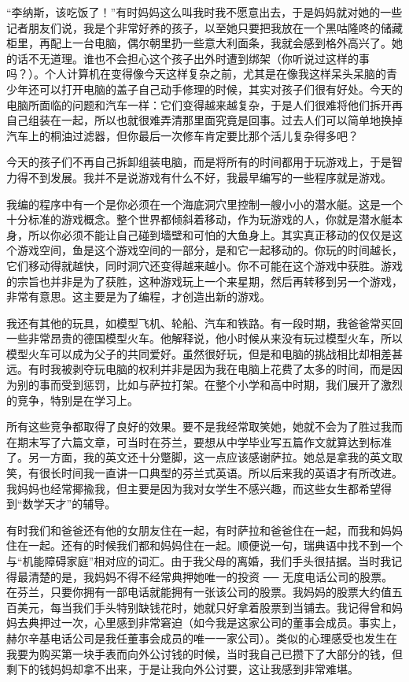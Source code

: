“李纳斯，该吃饭了！”有时妈妈这么叫我时我不愿意出去，于是妈妈就对她的一些记者朋友们说，我是个非常好养的孩子，以至她只要把我放在一个黑咕隆咚的储藏柜里，再配上一台电脑，偶尔朝里扔一些意大利面条，我就会感到格外高兴了。她的话不无道理。谁也不会担心这个孩子出外时遭到绑架（你听说过这样的事吗？）。个人计算机在变得像今天这样复杂之前，尤其是在像我这样呆头呆脑的青少年还可以打开电脑的盖子自己动手修理的时候，其实对孩子们很有好处。今天的电脑所面临的问题和汽车一样：它们变得越来越复杂，于是人们很难将他们拆开再自己组装在一起，所以也就很难弄清那里面究竟是回事。过去人们可以简单地换掉汽车上的桐油过滤器，但你最后一次修车肯定要比那个活儿复杂得多吧？

今天的孩子们不再自己拆卸组装电脑，而是将所有的时间都用于玩游戏上，于是智力得不到发展。我并不是说游戏有什么不好，我最早编写的一些程序就是游戏。

我编的程序中有一个是你必须在一个海底洞穴里控制一艘小小的潜水艇。这是一个十分标准的游戏概念。整个世界都倾斜着移动，作为玩游戏的人，你就是潜水艇本身，所以你必须不能让自己碰到墙壁和可怕的大鱼身上。其实真正移动的仅仅是这个游戏空间，鱼是这个游戏空间的一部分，是和它一起移动的。你玩的时间越长，它们移动得就越快，同时洞穴还变得越来越小。你不可能在这个游戏中获胜。游戏的宗旨也并非是为了获胜，这种游戏玩上一个来星期，然后再转移到另一个游戏，非常有意思。这主要是为了编程，才创造出新的游戏。

我还有其他的玩具，如模型飞机、轮船、汽车和铁路。有一段时期，我爸爸常买回一些非常昂贵的德国模型火车。他解释说，他小时候从来没有玩过模型火车，所以模型火车可以成为父子的共同爱好。虽然很好玩，但是和电脑的挑战相比却相差甚远。有时我被剥夺玩电脑的权利并非是因为我在电脑上花费了太多的时间，而是因为别的事而受到惩罚，比如与萨拉打架。在整个小学和高中时期，我们展开了激烈的竞争，特别是在学习上。

所有这些竞争都取得了良好的效果。要不是我经常取笑她，她就不会为了胜过我而在期末写了六篇文章，可当时在芬兰，要想从中学毕业写五篇作文就算达到标准了。另一方面，我的英文还十分蹩脚，这一点应该感谢萨拉。她总是拿我的英文取笑，有很长时间我一直讲一口典型的芬兰式英语。所以后来我的英语才有所改进。我妈妈也经常揶揄我，但主要是因为我对女学生不感兴趣，而这些女生都希望得到“数学天才”的辅导。

有时我们和爸爸还有他的女朋友住在一起，有时萨拉和爸爸住在一起，而我和妈妈住在一起。还有的时候我们都和妈妈住在一起。顺便说一句，瑞典语中找不到一个与“机能障碍家庭”相对应的词汇。由于我父母的离婚，我们手头很拮据。当时我记得最清楚的是，我妈妈不得不经常典押她唯一的投资 ── 无度电话公司的股票。在芬兰，只要你拥有一部电话就能拥有一张该公司的股票。我妈妈的股票大约值五百美元，每当我们手头特别缺钱花时，她就只好拿着股票到当铺去。我记得曾和妈妈去典押过一次，心里感到非常窘迫（如今我是这家公司的董事会成员。事实上，赫尔辛基电话公司是我任董事会成员的唯一一家公司）。类似的心理感受也发生在我要为购买第一块手表而向外公讨钱的时候，当时我自己已攒下了大部分的钱，但剩下的钱妈妈却拿不出来，于是让我向外公讨要，这让我感到非常难堪。

